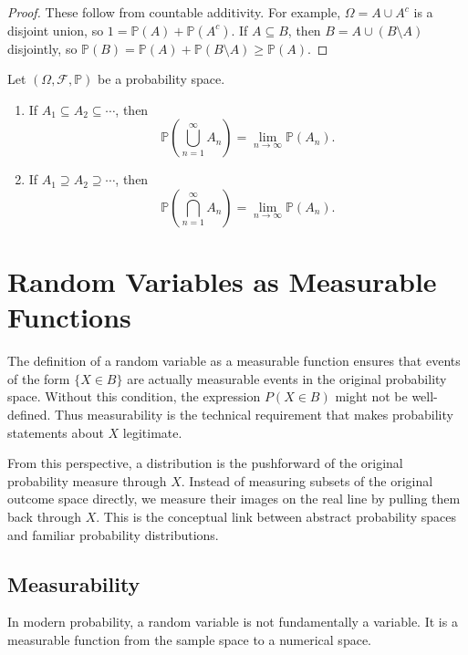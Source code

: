 \begin{proof}
These follow from countable additivity. For example, $\Omega=A\cup A^c$ is a disjoint union, so $1=\mathbb{P}(A)+\mathbb{P}(A^c)$. If $A\subseteq B$, then $B=A\cup(B\setminus A)$ disjointly, so $\mathbb{P}(B)=\mathbb{P}(A)+\mathbb{P}(B\setminus A)\geq\mathbb{P}(A)$.
\end{proof}

\begin{proposition}
Let $(\Omega,\mathcal{F},\mathbb{P})$ be a probability space.
\begin{enumerate}
    \item If $A_1\subseteq A_2\subseteq\cdots$, then
    \[
        \mathbb{P}\left(\bigcup_{n=1}^{\infty}A_n\right)=\lim_{n\to\infty}\mathbb{P}(A_n).
    \]
    \item If $A_1\supseteq A_2\supseteq\cdots$, then
    \[
        \mathbb{P}\left(\bigcap_{n=1}^{\infty}A_n\right)=\lim_{n\to\infty}\mathbb{P}(A_n).
    \]
\end{enumerate}
\end{proposition}

\section{Random Variables as Measurable Functions}


The definition of a random variable as a measurable function ensures that events of the form $\{X\in B\}$ are actually measurable events in the original probability space. Without this condition, the expression $P(X\in B)$ might not be well-defined. Thus measurability is the technical requirement that makes probability statements about $X$ legitimate.

From this perspective, a distribution is the pushforward of the original probability measure through $X$. Instead of measuring subsets of the original outcome space directly, we measure their images on the real line by pulling them back through $X$. This is the conceptual link between abstract probability spaces and familiar probability distributions.

\subsection{Measurability}

In modern probability, a random variable is not fundamentally a variable. It is a measurable function from the sample space to a numerical space.

